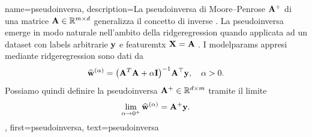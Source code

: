 
{name={pseudoinversa},
  description={La  pseudoinversa di Moore–Penrose ${\bf A}^{+}$ 
 di una matrice ${\bf A} \in \mathbb{R}^{m \times d}$ generalizza il 
 concetto di \gls{inverse} \cite{GolubVanLoanBook}. La pseudoinversa emerge in modo naturale 
 nell’ambito della \gls{ridgeregression} quando applicata ad un \gls{dataset} con \glspl{label} arbitrarie ${\bf y}$ 
 e \gls{featuremtx} ${\bf X} = {\bf A}$ \cite[Ch.\ 3]{hastie01statisticallearning}. I \gls{modelparams} 
 appresi mediante \gls{ridgeregression} 
  sono dati da
  	\[
  	\widehat{{\bf w}}^{(\alpha)}  = \big({\bf A}^T {\bf A} + \alpha \mathbf{I} \big)^{-1} {\bf A}^\top {\bf y}, \quad \alpha > 0.
  	\]
  	Possiamo quindi definire la pseudoinversa  ${\bf A}^+ \in \mathbb{R}^{d \times m}$ tramite 
  	il limite \cite[Ch. 3]{benisrael2003generalized}
  	\[
  	\lim_{\alpha \to 0^+} \widehat{{\bf w}}^{(\alpha)} = {\bf A}^+ {\bf y}.
  	\]
	},
 	first={pseudoinversa},
 	text={pseudoinversa}
 }
 


